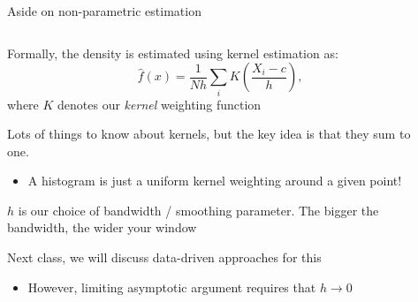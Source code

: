 \documentclass[notes,11pt, aspectratio=169]{beamer}
\newenvironment{wideitemize}{\itemize\addtolength{\itemsep}{10pt}}{\enditemize}
\begin{document}
\begin{frame}{Aside on non-parametric estimation}
  \begin{columns}[onlytextwidth, T] %
    \begin{column}{.7\textwidth}
  \begin{wideitemize}
  \item Formally, the density is estimated using kernel estimation as:
    \begin{equation*}
      \hat{f}(x) = \frac{1}{Nh}\sum_{i}K\left(\frac{X_{i} - c}{h}\right),
    \end{equation*}
    where $K$ denotes our \emph{kernel} weighting function
  \item Lots of things to know about kernels, but the key idea is that they sum to one.
    \begin{itemize}
    \item A histogram is just a uniform kernel weighting around a given point!
    \end{itemize}
  \item $h$ is our choice of bandwidth / smoothing parameter. The
    bigger the bandwidth, the wider your window
  \item Next class, we will discuss data-driven approaches for this
    \begin{itemize}
    \item However, limiting asymptotic argument requires that $h \to 0$
    \end{itemize}
  \end{wideitemize}
    \end{column}%
    \hfill%
    \begin{column}{.3\textwidth}

\end{column}
\end{columns}
\end{frame}
\end{document}
